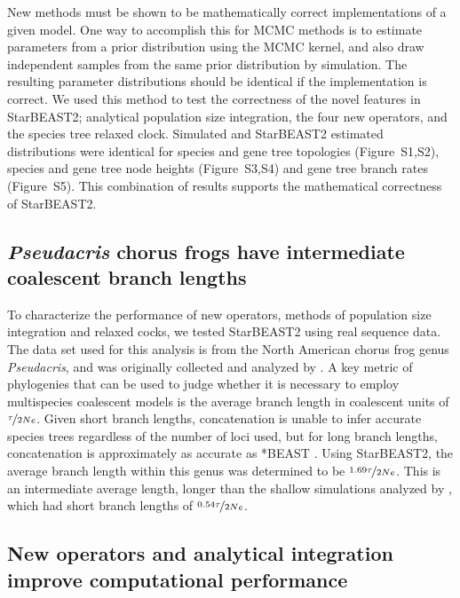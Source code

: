 \documentclass[12pt]{article}
\begin{document}
New methods must be shown to be mathematically correct implementations of a
given model. One way to accomplish this for MCMC methods is to estimate
parameters from a prior distribution using the MCMC kernel, and also draw
independent samples from the same prior distribution by simulation. The
resulting parameter distributions should be identical if the implementation is
correct. We used this method to test the correctness of the novel features in
StarBEAST2; analytical population size integration, the four new operators, and
the species tree relaxed clock. Simulated and StarBEAST2 estimated distributions
were identical for species and gene tree topologies (Figure~S1,S2), species and
gene tree node heights (Figure~S3,S4) and gene tree branch rates (Figure~S5).
This combination of results supports the mathematical correctness of StarBEAST2.

\subsection{\textit{Pseudacris} chorus frogs have intermediate coalescent branch lengths}

To characterize the performance of new operators, methods of population size
integration and relaxed cocks, we tested StarBEAST2 using real sequence data.
The data set used for this analysis is from the North American chorus frog genus
\textit{Pseudacris}, and was originally collected and analyzed by
\cite{Barrow201478}. A key metric of phylogenies that can be used to judge
whether it is necessary to employ multispecies coalescent models is the average
branch length in coalescent units of $\nicefrac{\tau}{2Ne}$. Given short branch
lengths, concatenation is unable to infer accurate species trees regardless of
the number of loci used, but for long branch lengths, concatenation is
approximately as accurate as *BEAST \citep{Ogilvie01052016}. Using StarBEAST2,
the average branch length within this genus was determined to be
$\nicefrac{1.69\tau}{2Ne}$. This is an intermediate average length, longer than
the shallow simulations analyzed by \cite{Ogilvie01052016}, which had short
branch lengths of $\nicefrac{0.54\tau}{2Ne}$.

\subsection{New operators and analytical integration improve computational performance}
\end{document}
